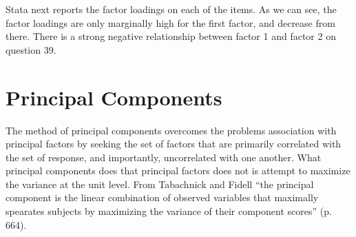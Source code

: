 \documentclass[12pt]{article}
\begin{document}
Stata next reports the factor loadings on each of the items. As we can
see, the factor loadings are only marginally high for the first
factor, and decrease from there. There is a strong negative
relationship between factor 1 and factor 2 on question 39. 

\section{Principal Components}

The method of principal components overcomes the problems association
with principal factors by seeking the set of factors that are
primarily correlated with the set of response, and importantly,
uncorrelated with one another. What principal components does that
principal factors does not is attempt to maximize the variance at the
unit level. From Tabachnick and Fidell ``the principal component is
the linear combination of observed variables that maximally spearates
subjects by maximizing the variance of their component scores''
(p. 664). 
\end{document}
